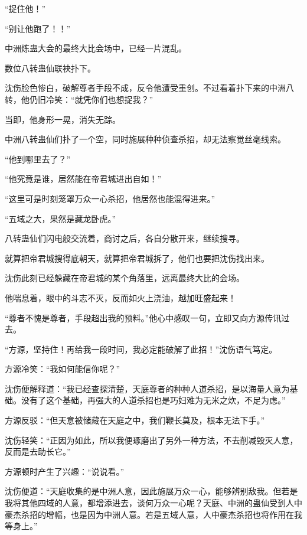 
\begin{this_body}



“捉住他！”

“别让他跑了！！”

中洲炼蛊大会的最终大比会场中，已经一片混乱。

数位八转蛊仙联袂扑下。

沈伤脸色惨白，破解尊者手段不成，反令他遭受重创。不过看着扑下来的中洲八转，他仍旧冷笑：“就凭你们也想捉我？”

当即，他身形一晃，消失无踪。

中洲八转蛊仙们扑了一个空，同时施展种种侦查杀招，却无法察觉丝毫线索。

“他到哪里去了？”

“他究竟是谁，居然能在帝君城进出自如！”

“这里可是时刻笼罩万众一心杀招，他居然也能混得进来。”

“五域之大，果然是藏龙卧虎。”

八转蛊仙们闪电般交流着，商讨之后，各自分散开来，继续搜寻。

就算把帝君城搜得底朝天，就算把帝君城拆了，他们也要把沈伤找出来。

沈伤此刻已经躲藏在帝君城的某个角落里，远离最终大比的会场。

他喘息着，眼中的斗志不灭，反而如火上浇油，越加旺盛起来！

“尊者不愧是尊者，手段超出我的预料。”他心中感叹一句，立即又向方源传讯过去。

“方源，坚持住！再给我一段时间，我必定能破解了此招！”沈伤语气笃定。

方源冷笑：“我如何能信你呢？”

沈伤便解释道：“我已经查探清楚，天庭尊者的种种人道杀招，是以海量人意为基础。没有了这个基础，再强大的人道杀招也是巧妇难为无米之炊，不足为虑。”

方源反驳：“但天意被储藏在天庭之中，我们鞭长莫及，根本无法下手。”

沈伤轻笑：“正因为如此，所以我便琢磨出了另外一种方法，不去削减毁灭人意，反而是去助长它。”

方源顿时产生了兴趣：“说说看。”

沈伤便道：“天庭收集的是中洲人意，因此施展万众一心，能够辨别敌我。但若是我将其他四域的人意，都增添进去，谈何万众一心呢？天庭、中洲的蛊仙受到人中豪杰杀招的增幅，也是因为中洲人意。若是五域人意，人中豪杰杀招也将作用在我等身上。”


\end{this_body}
